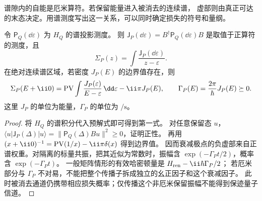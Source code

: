 谱隙内的自能是厄米算符。若保留能量进入被消去的连续谱，
虚部则由真正可达的末态决定。用谱测度写出这一关系，可以同时确定损失的符号和量纲。

\begin{proposition}[谱密度与自能的损失号]
令 $\mathsf P_Q(\dd\varepsilon)$ 为 $H_Q$ 的谱投影测度。
则 $\mathsf J_P(\dd\varepsilon)=B^\dagger\mathsf P_Q(\dd\varepsilon)B$
是取值于正算符的测度，且
\begin{equation}
\Sigma_P(z)=\int\frac{\mathsf J_P(\dd\varepsilon)}{z-\varepsilon}.
\label{eq:feqo-feshbach-positive-spectral-measure}
\end{equation}
在绝对连续谱区域，若密度 $J_P(E)$ 的边界值存在，则
\begin{equation}
\Sigma_P(E+\ii0)=\mathop{\rm PV}\int
\frac{J_P(\varepsilon)}{E-\varepsilon}\,\dd\varepsilon
-\ii\pi J_P(E),\qquad
\Gamma_P(E)=\frac{2\pi}{\hbar}J_P(E)\succeq0.
\label{eq:feqo-feshbach-width-positive}
\end{equation}
这里 $J_P$ 的单位为能量，$\Gamma_P$ 的单位为 $\si{\per\second}$。
\end{proposition}
\begin{proof}
将 $H_Q$ 的谱积分代入预解式即可得到第一式。
对任意保留态 $u$，$\langle u|\mathsf J_P(\Delta)|u\rangle
=\|\mathsf P_Q(\Delta)Bu\|^2\ge0$，证明正性。
再用 $(x+\ii0)^{-1}=\mathop{\rm PV}(1/x)-\ii\pi\delta(x)$ 得到边界值。
因而衰减极点的负虚部来自正谱权重。对隔离的标量共振，把其近似为常数时，振幅含
$\exp(-\Gamma_Pt/2)$，概率含 $\exp(-\Gamma_Pt)$。
一般矩阵情形的有效哈密顿量是 $H_{\rm ren}-\ii\hbar\Gamma_P/2$；
若厄米部分与 $\Gamma_P$ 不对易，不能把整个传播子拆成独立的幺正因子和这个衰减因子。
此时被消去通道仍携带相应损失概率；仅传播这个非厄米保留振幅不能得到保迹量子信道。
\end{proof}

